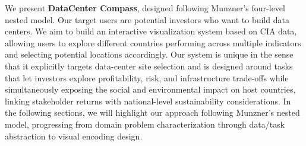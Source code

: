 \documentclass{vgtc}                          %
\begin{document}
\noindent We present \textbf{DataCenter Compass}, designed following Munzner's four-level nested model. Our target users are potential investors who want to build data centers. We aim to build an interactive visualization system based on CIA data, allowing users to explore different countries performing across multiple indicators and selecting potential locations accordingly. Our system is unique in the sense that it explicitly targets data-center site selection and is designed around tasks that let investors explore profitability, risk, and infrastructure trade-offs while simultaneously exposing the social and environmental impact on host countries, linking stakeholder returns with national-level sustainability considerations. In the following sections, we will highlight our approach following Munzner's nested model, progressing from domain problem characterization through data/task abstraction to visual encoding design. 




\end{document}
